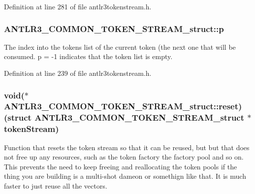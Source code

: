 Definition at line 281 of file antlr3tokenstream.\-h.

\hypertarget{struct_a_n_t_l_r3___c_o_m_m_o_n___t_o_k_e_n___s_t_r_e_a_m__struct_a03a16d2ed34642468b22aab98dabb1d1}{
\subsubsection[{p}]{ A\-N\-T\-L\-R3\-\_\-\-C\-O\-M\-M\-O\-N\-\_\-\-T\-O\-K\-E\-N\-\_\-\-S\-T\-R\-E\-A\-M\-\_\-struct\-::p}}\label{struct_a_n_t_l_r3___c_o_m_m_o_n___t_o_k_e_n___s_t_r_e_a_m__struct_a03a16d2ed34642468b22aab98dabb1d1}
The index into the tokens list of the current token (the next one that will be consumed. p = -\/1 indicates that the token list is empty. 

Definition at line 239 of file antlr3tokenstream.\-h.

\hypertarget{struct_a_n_t_l_r3___c_o_m_m_o_n___t_o_k_e_n___s_t_r_e_a_m__struct_ada755310e5f119666289a36ba8a9f0ce}{
\subsubsection[{reset}]{\setlength{\rightskip}{0pt plus 5cm}void($\ast$ A\-N\-T\-L\-R3\-\_\-\-C\-O\-M\-M\-O\-N\-\_\-\-T\-O\-K\-E\-N\-\_\-\-S\-T\-R\-E\-A\-M\-\_\-struct\-::reset)(struct {\bf A\-N\-T\-L\-R3\-\_\-\-C\-O\-M\-M\-O\-N\-\_\-\-T\-O\-K\-E\-N\-\_\-\-S\-T\-R\-E\-A\-M\-\_\-struct} $\ast$token\-Stream)}}\label{struct_a_n_t_l_r3___c_o_m_m_o_n___t_o_k_e_n___s_t_r_e_a_m__struct_ada755310e5f119666289a36ba8a9f0ce}
Function that resets the token stream so that it can be reused, but but that does not free up any resources, such as the token factory the factory pool and so on. This prevents the need to keep freeing and reallocating the token pools if the thing you are building is a multi-\/shot dameon or somethign like that. It is much faster to just reuse all the vectors. 

